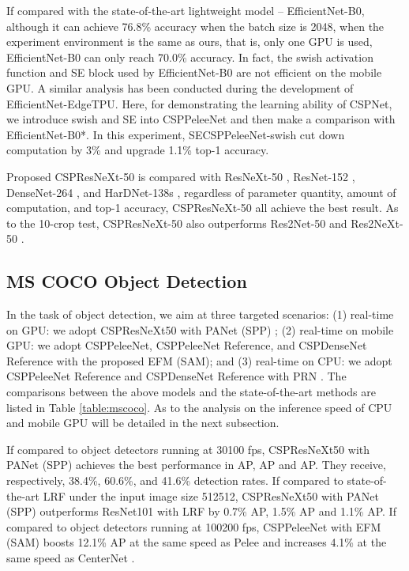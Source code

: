 \documentclass{article}
\begin{document}
If compared with the state-of-the-art lightweight model -- EfficientNet-B0, although it can achieve 76.8\% accuracy when the batch size is 2048, when the experiment environment is the same as ours, that is, only one GPU is used, EfficientNet-B0 can only reach 70.0\% accuracy.  In fact, the swish activation function and SE block used by EfficientNet-B0 are not efficient on the mobile GPU.  A similar analysis has been conducted during the development of EfficientNet-EdgeTPU.  Here, for demonstrating the learning ability of CSPNet, we introduce swish and SE into CSPPeleeNet and then make a comparison with EfficientNet-B0*.  In this experiment, SECSPPeleeNet-swish cut down computation by 3\% and upgrade 1.1\% top-1 accuracy.

Proposed CSPResNeXt-50 is compared with ResNeXt-50 \cite{xie2017aggregated}, ResNet-152 \cite{he2016deep}, DenseNet-264 \cite{huang2017densely}, and HarDNet-138s \cite{chao2019hardnet}, regardless of parameter quantity, amount of computation, and top-1 accuracy, CSPResNeXt-50 all achieve the best result.  As to the 10-crop test, CSPResNeXt-50 also outperforms Res2Net-50 \cite{gao2019res2net} and Res2NeXt-50 \cite{gao2019res2net}.

\subsection{MS COCO Object Detection}

In the task of object detection, we aim at three targeted scenarios: (1) real-time on GPU: we adopt CSPResNeXt50 with PANet (SPP) \cite{liu2018path}; (2) real-time on mobile GPU: we adopt CSPPeleeNet, CSPPeleeNet Reference, and CSPDenseNet Reference with the proposed EFM (SAM); and (3) real-time on CPU: we adopt CSPPeleeNet Reference and CSPDenseNet Reference with PRN \cite{wang2019enriching}.  The comparisons between the above models and the state-of-the-art methods are listed in Table \ref{table:mscoco}.  As to the analysis on the inference speed of CPU and mobile GPU will be detailed in the next subsection.

If compared to object detectors running at 30100 fps, CSPResNeXt50 with PANet (SPP) achieves the best performance in AP, AP and AP.  They receive, respectively, 38.4\%, 60.6\%, and 41.6\% detection rates.  If compared to state-of-the-art LRF \cite{wang2019learning} under the input image size 512512, CSPResNeXt50 with PANet (SPP) outperforms ResNet101 with LRF by 0.7\% AP, 1.5\% AP and 1.1\% AP.  If compared to object detectors running at 100200 fps, CSPPeleeNet with EFM (SAM) boosts 12.1\% AP at the same speed as Pelee \cite{wang2018pelee} and increases 4.1\% \cite{wang2018pelee} at the same speed as CenterNet \cite{zhou2019objects}.
\end{document}
